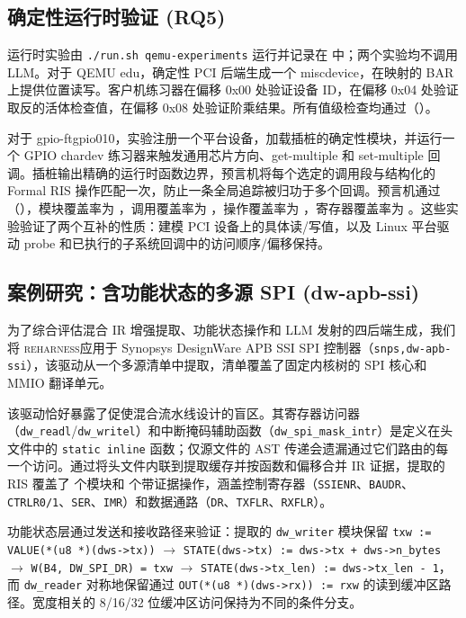 \documentclass[sigplan, screen, review, anonymous]{acmart}
\newcommand{\reharness}{\textsc{reharness}}
\begin{document}
\subsection{确定性运行时验证 (RQ5)}

运行时实验由 \texttt{./run.sh qemu-experiments} 运行并记录在  中；两个实验均不调用 LLM。对于 QEMU edu，确定性 PCI 后端生成一个 miscdevice，在映射的 BAR 上提供位置读写。客户机练习器在偏移 0x00 处验证设备 ID，在偏移 0x04 处验证取反的活体检查值，在偏移 0x08 处验证阶乘结果。所有值级检查均通过（\texttt{\EduQEMUOracle}）。

对于 gpio-ftgpio010，实验注册一个平台设备，加载插桩的确定性模块，并运行一个 GPIO chardev 练习器来触发通用芯片方向、get-multiple 和 set-multiple 回调。插桩输出精确的运行时函数边界，预言机将每个选定的调用段与结构化的 Formal RIS 操作匹配一次，防止一条全局追踪被归功于多个回调。预言机通过（\texttt{\FTQEMUOracle}），模块覆盖率为 \FTQEMUModuleCoverage{}，调用覆盖率为 \FTQEMUCallCoverage{}，操作覆盖率为 \FTQEMUOpCoverage{}，寄存器覆盖率为 \FTQEMURegisterCoverage{}。这些实验验证了两个互补的性质：建模 PCI 设备上的具体读/写值，以及 Linux 平台驱动 probe 和已执行的子系统回调中的访问顺序/偏移保持。

\subsection{案例研究：含功能状态的多源 SPI (dw-apb-ssi)}

为了综合评估混合 IR 增强提取、功能状态操作和 LLM 发射的四后端生成，我们将 \reharness 应用于 Synopsys DesignWare APB SSI SPI 控制器（\texttt{snps,dw-apb-ssi}），该驱动从一个多源清单中提取，清单覆盖了固定内核树的 SPI 核心和 MMIO 翻译单元。

该驱动恰好暴露了促使混合流水线设计的盲区。其寄存器访问器（\texttt{dw\_readl}/\texttt{dw\_writel}）和中断掩码辅助函数（\texttt{dw\_spi\_mask\_intr}）是定义在头文件中的 \texttt{static inline} 函数；仅源文件的 AST 传递会遗漏通过它们路由的每一个访问。通过将头文件内联到提取缓存并按函数和偏移合并 IR 证据，提取的 RIS 覆盖了 \DWRISModules{} 个模块和 \DWRISOps{} 个带证据操作，涵盖控制寄存器（\texttt{SSIENR}、\texttt{BAUDR}、\texttt{CTRLR0/1}、\texttt{SER}、\texttt{IMR}）和数据通路（\texttt{DR}、\texttt{TXFLR}、\texttt{RXFLR}）。

功能状态层通过发送和接收路径来验证：提取的 \texttt{dw\_writer} 模块保留 \texttt{txw := VALUE(*(u8 *)(dws->tx))} $\rightarrow$ \texttt{STATE(dws->tx) := dws->tx + dws->n\_bytes} $\rightarrow$ \texttt{W(B4, DW\_SPI\_DR) = txw} $\rightarrow$ \texttt{STATE(dws->tx\_len) := dws->tx\_len - 1}，而 \texttt{dw\_reader} 对称地保留通过 \texttt{OUT(*(u8 *)(dws->rx)) := rxw} 的读到缓冲区路径。宽度相关的 8/16/32 位缓冲区访问保持为不同的条件分支。
\end{document}
